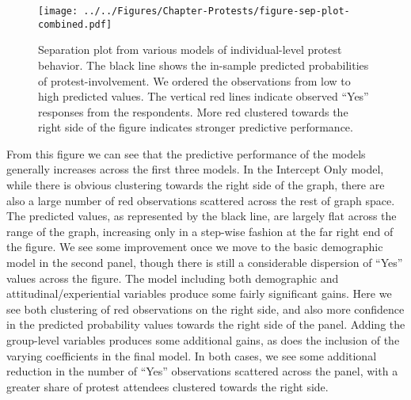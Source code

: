 \begin{figure}[t]
	\centering\texttt{[image: ../../Figures/Chapter-Protests/figure-sep-plot-combined.pdf]}
	\caption{Separation plot from various models of individual-level protest behavior. The black line shows the in-sample predicted probabilities of protest-involvement. We ordered the observations from low to high predicted values. The vertical red lines indicate observed ``Yes'' responses from the respondents. More red clustered towards the right side of the figure indicates stronger predictive performance.}
	\label{fig:sepplotcombined}
\end{figure}

From this figure we can see that the predictive performance of the models generally increases across the first three models. In the Intercept Only model, while there is obvious clustering towards the right side of the graph, there are also a large number of red observations scattered across the rest of graph space. The predicted values, as represented by the black line, are largely flat across the range of the graph, increasing only in a step-wise fashion at the far right end of the figure. We see some improvement once we move to the basic demographic model in the second panel, though there is still a considerable dispersion of ``Yes'' values across the figure. The model including both demographic and attitudinal/experiential variables produce some fairly significant gains. Here we see both clustering of red observations on the right side, and also more confidence in the predicted probability values towards the right side of the panel. Adding the group-level variables produces some additional gains, as does the inclusion of the varying coefficients in the final model. In both cases, we see some additional reduction in the number of ``Yes'' observations scattered across the panel, with a greater share of protest attendees clustered towards the right side.  



